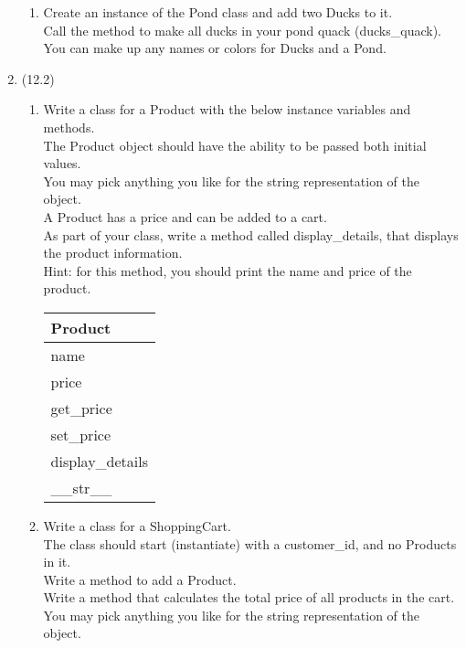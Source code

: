 \documentclass{article}
\begin{document}
\begin{enumerate}
\begin{enumerate}
		\item
			Create an instance of the Pond class and add two Ducks to it.\\
			Call the method to make all ducks in your pond quack (ducks\_quack).\\
			You can make up any names or colors for Ducks and a Pond.\\
	\end{enumerate}
\pagebreak



\item (12.2)
	\begin{enumerate}
		\item
			Write a class for a Product with the below instance variables and methods.\\ 
			The Product object should have the ability to be passed both initial values.\\  
			You may pick anything you like for the string representation of the object.\\
			A Product has a price and can be added to a cart.\\  
			As part of your class, write a method called display\_details, that displays the product information.\\
			Hint: for this method, you should print the name and price of the product.
			\begin{flushright}
			\begin{tabular}{|l|}
				\hline
				Product\\ \hline
				name\\	price\\	 \hline
				get\_price \\ set\_price \\ display\_details \\ \_\_str\_\_ \\ \hline
			\end{tabular}
			\end{flushright}

		\item
			Write a class for a ShoppingCart. \\
			The class should start (instantiate) with a customer\_id, and no Products in it. \\ 
			Write a method to add a Product.\\
			Write a method that calculates the total price of all products in the cart.\\
			You may pick anything you like for the string representation of the object.
	

\end{enumerate}
\end{enumerate}
\end{document}
